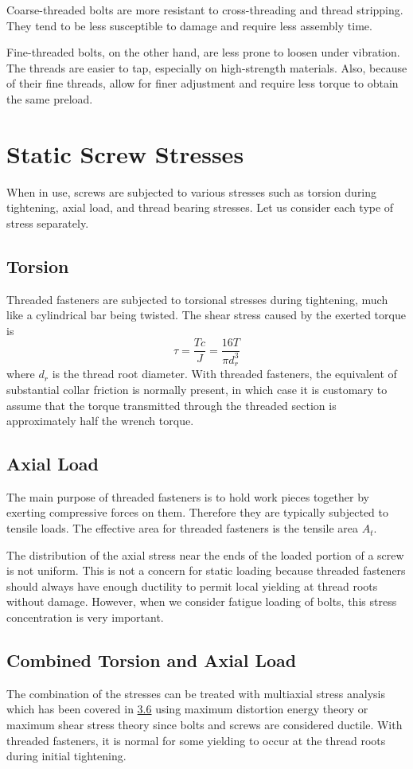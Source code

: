\documentclass[a4paper,openany,12pt]{book}
\begin{document}
{{Coarse-threaded bolts are more resistant to cross-threading and thread
stripping. They tend to be less susceptible to damage and require less
assembly time.

Fine-threaded bolts, on the other hand, are less prone to loosen under
vibration. The threads are easier to tap, especially on high-strength
materials. Also, because of their fine threads, allow for finer
adjustment and require less torque to obtain the same preload.

\section{Static Screw Stresses}
\label{static-screw-stresses}
When in use, screws are subjected to various stresses such as torsion
during tightening, axial load, and thread bearing stresses. Let us
consider each type of stress separately.

\subsection{Torsion}
\label{torsion-1}
Threaded fasteners are subjected to torsional stresses during
tightening, much like a cylindrical bar being twisted. The shear stress
caused by the exerted torque is
$$\tau  = \frac{Tc}{J} = \frac{16T}{\pi d_r^3}$$ where \(d_r\) is the
thread root diameter. With threaded fasteners, the equivalent of
substantial collar friction is normally present, in which case it is
customary to assume that the torque transmitted through the threaded
section is approximately half the wrench torque.

\subsection{Axial Load}
\label{axial-load}
The main purpose of threaded fasteners is to hold work pieces together
by exerting compressive forces on them. Therefore they are typically
subjected to tensile loads. The effective area for threaded fasteners is
the tensile area \(A_t\).

The distribution of the axial stress near the ends of the loaded portion
of a screw is not uniform. This is not a concern for static loading
because threaded fasteners should always have enough ductility to permit
local yielding at thread roots without damage. However, when we consider
fatigue loading of bolts, this stress concentration is very important.

\subsection{Combined Torsion and Axial Load}
\label{combined-torsion-and-axial-load}
The combination of the stresses can be treated with multiaxial stress
analysis which has been covered in \hyperref[section: multiaxial stress]{3.6}
using maximum distortion energy theory or maximum shear stress theory
since bolts and screws are considered ductile. With threaded fasteners,
it is normal for some yielding to occur at the thread roots during
initial tightening.

}}
\end{document}
